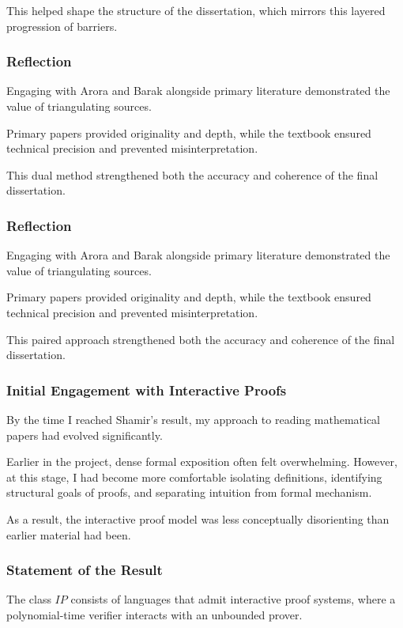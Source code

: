 \documentclass[12pt]{article}
\begin{document}
This helped shape the structure of the dissertation, which mirrors this layered progression of barriers.

\subsubsection*{Reflection}

Engaging with Arora and Barak alongside primary literature demonstrated the value of triangulating sources.

Primary papers provided originality and depth, while the textbook ensured technical precision and prevented misinterpretation.

This dual method strengthened both the accuracy and coherence of the final dissertation.

\subsubsection*{Reflection}

Engaging with Arora and Barak alongside primary literature demonstrated the value of triangulating sources.

Primary papers provided originality and depth, while the textbook ensured technical precision and prevented misinterpretation.

This paired approach strengthened both the accuracy and coherence of the final dissertation.

\subsubsection*{Initial Engagement with Interactive Proofs}

By the time I reached Shamir's result, my approach to reading mathematical papers had evolved significantly.

Earlier in the project, dense formal exposition often felt overwhelming. 
However, at this stage, I had become more comfortable isolating definitions, identifying structural goals of proofs, and separating intuition from formal mechanism.

As a result, the interactive proof model was less conceptually disorienting than earlier material had been.

\subsubsection*{Statement of the Result}

The class $IP$ consists of languages that admit interactive proof systems, where a polynomial-time verifier interacts with an unbounded prover.
\end{document}
